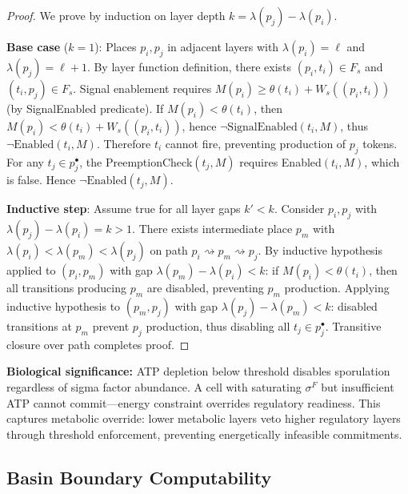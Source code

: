 \documentclass[10pt,letterpaper]{article}
\begin{document}
\begin{proof}
We prove by induction on layer depth $k = \lambda(p_j) - \lambda(p_i)$.

\textbf{Base case} ($k=1$): Places $p_i, p_j$ in adjacent layers with $\lambda(p_i) = \ell$ and $\lambda(p_j) = \ell+1$. By layer function definition, there exists $(p_i,t_i) \in F_s$ and $(t_i,p_j) \in F_s$. Signal enablement requires
$M(p_i) \geq \theta(t_i) + W_s((p_i,t_i))$
(by SignalEnabled predicate). If $M(p_i) < \theta(t_i)$, then
$M(p_i) < \theta(t_i) + W_s((p_i,t_i))$,
hence $\neg\text{SignalEnabled}(t_i,M)$, thus $\neg\text{Enabled}(t_i,M)$. Therefore $t_i$ cannot fire, preventing production of $p_j$ tokens. For any $t_j \in p_j^\bullet$, the PreemptionCheck$(t_j,M)$ requires Enabled$(t_i,M)$, which is false. Hence $\neg\text{Enabled}(t_j,M)$.

\textbf{Inductive step}: Assume true for all layer gaps $k' < k$. Consider $p_i, p_j$ with $\lambda(p_j) - \lambda(p_i) = k > 1$. There exists intermediate place $p_m$ with $\lambda(p_i) < \lambda(p_m) < \lambda(p_j)$ on path $p_i \rightsquigarrow p_m \rightsquigarrow p_j$. By inductive hypothesis applied to $(p_i,p_m)$ with gap $\lambda(p_m) - \lambda(p_i) < k$: if $M(p_i) < \theta(t_i)$, then all transitions producing $p_m$ are disabled, preventing $p_m$ production. Applying inductive hypothesis to $(p_m,p_j)$ with gap $\lambda(p_j) - \lambda(p_m) < k$: disabled transitions at $p_m$ prevent $p_j$ production, thus disabling all $t_j \in p_j^\bullet$. Transitive closure over path completes proof.
\end{proof}

\textbf{Biological significance:} ATP depletion below threshold disables sporulation regardless of sigma factor abundance. A cell with saturating $\sigma^F$ but insufficient ATP cannot commit---energy constraint overrides regulatory readiness. This captures metabolic override: lower metabolic layers veto higher regulatory layers through threshold enforcement, preventing energetically infeasible commitments.

\subsection{Basin Boundary Computability}
\end{document}
